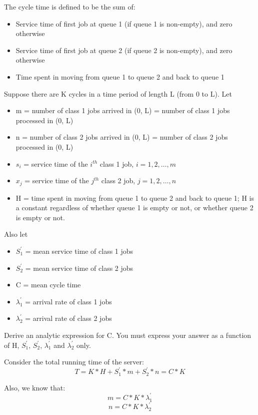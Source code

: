 \documentclass[letterpaper]{article}
\begin{document}
\begin{enumerate}
\begin{enumerate}
The cycle time is defined to be the sum of:
\begin{itemize}
\item{} Service time of first job at queue 1 (if queue 1 is non-empty), and zero otherwise
\item{} Service time of first job at queue 2 (if queue 2 is non-empty), and zero otherwise
\item{} Time spent in moving from queue 1 to queue 2 and back to queue 1
\end{itemize}

Suppose there are K cycles in a time period of length L (from 0 to L). Let
\begin{itemize}
\item{} m = number of class 1 jobs arrived in (0, L) = number of class 1 jobs processed in (0, L)
\item{} n = number of class 2 jobs arrived in (0, L) = number of class 2 jobs processed in (0, L)
\item{} $s_i$ = service time of the $i^{th}$ class 1 job, $i = 1, 2, \dotsc, m$
\item{} $x_j$ = service time of the $j^{th}$ class 2 job, $j = 1, 2, \dotsc, n$
\item{} H = time spent in moving from queue 1 to queue 2 and back to queue 1; H is a constant regardless of whether queue 1 is empty or not, or whether queue 2 is empty or not.
\end{itemize}

Also let
\begin{itemize}
\item{} $S_1^{'}$ = mean service time of class 1 jobs
\item{} $S_2^{'}$ = mean service time of class 2 jobs
\item{} C = mean cycle time
\item{} $\lambda_1^{'}$ = arrival rate of class 1 jobs
\item{} $\lambda_2^{'}$ = arrival rate of class 2 jobs
\end{itemize}
Derive an analytic expression for C. You must express your answer as a function of H, $S_1^{'}$, $S_2^{'}$, $\lambda_1^{'}$ and $\lambda_2^{'}$ only.

Consider the total running time of the server:
\begin{equation}
T = K * H + S_1^{'} * m + S_2^{'} * n = C * K
\end{equation}

Also, we know that:
\begin{equation}
m = C * K * \lambda_1^{'}
\end{equation}
\begin{equation}
n = C * K * \lambda_2^{'}
\end{equation}


\end{enumerate}
\end{enumerate}
\end{document}
